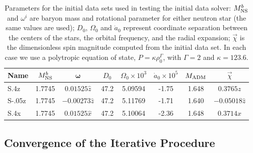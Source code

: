 \documentclass[aps,prd,amsmath,floatfix
,twocolumn
,superscriptaddress,nofootinbib,showpacs]{revtex4-1}
\theoremstyle{plain} \newtheorem{thm}{Theorem} \newtheorem{lem}{Lemma}
\newcommand{\red}[1]{\textcolor{Red}{#1}}
\begin{document}
\begin{table}
\begin{tabular}{l|cc|ccc|cc}
Name & $M^b_{\rm NS}$ & ${\bm \omega}$ & $D_0$ & $\Omega_0 \times 10^{3}$ & $\dot{a}_0 
\times 10^{5}$  & $M_{\rm ADM}$ &  $\vec\chi$ 
\\\hline
S.4z & 1.7745 & $0.01525\hat{z}$ & 47.2 & 5.09594 & -1.75 & 1.648 & $0.3765\hat{z}$ \\
S-.05z & 1.7745 & $-0.00273\hat{z}$ & 47.2 & 5.11769 & -1.71 & 1.640 & $-0.05018\hat{z}$ \\
S.4x & 1.7745 & $0.01525\hat{x}$ & 47.2 & 5.10064 & -2.36 & 1.648 & $0.3714\hat{x}$\\
\end{tabular}
\caption{\label{tab:InitialData}
Parameters for the initial data sets used in testing the initial data solver: $M^b_{\rm NS}$ and $\omega^i$ are baryon mass and rotational parameter for either neutron star (the same values are used); $D_0$, $\Omega_0$ and $\dot a_{0}$ represent coordinate separation between the centers of the stars, the orbital frequency, and the radial expansion; $\vec\chi$ is the dimensionless spin magnitude computed from the initial data set. In each case we use a polytropic equation of state, $P=\kappa\rho_0^{\Gamma}$, with $\Gamma=2$ and $\kappa=123.6$.}
\end{table}


\subsection{Convergence of the Iterative Procedure}
\end{document}
